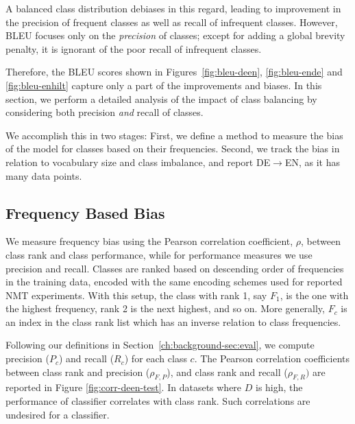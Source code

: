 A balanced class distribution debiases in this regard, leading to improvement in the precision of frequent classes as well as recall of infrequent classes.
However, BLEU focuses only on the \textit{precision} of classes; except for adding a global brevity penalty, it is ignorant of the poor recall of infrequent classes. 

Therefore, the BLEU scores shown in Figures~\ref{fig:bleu-deen}, \ref{fig:bleu-ende} and \ref{fig:bleu-enhilt} capture only a part of the improvements and biases. 
In this section, we perform a detailed analysis of the impact of class balancing by considering both precision \textit{and} recall of classes. 

We accomplish this in two stages:
First, we define a method to measure the bias of the model for classes based on their frequencies.
Second, we track the bias in relation to vocabulary size and class imbalance, and report DE$\rightarrow$EN, as it has many data points.

\subsection{Frequency Based Bias}
We measure frequency bias using the Pearson correlation coefficient, $\rho$, between class rank and class performance, while for performance measures we use precision and recall.
Classes are ranked based on descending order of frequencies in the training data, encoded with the same encoding schemes used for reported NMT experiments.
With this setup, the class with rank 1, say $F_1$, is the one with the highest frequency, rank 2 is the next highest, and so on.
More generally, $F_c$ is an index in the class rank list which has an inverse relation to class frequencies.

Following our definitions in Section~\ref{ch:background-sec:eval}, we compute precision ($P_c$) and recall ($R_c$) for each class $c$.
The Pearson correlation coefficients between class rank and precision ($\rho_{F, P}$), and class rank and recall ($\rho_{F, R})$ are reported in Figure \ref{fig:corr-deen-test}.
In datasets where $D$ is high, the performance of classifier correlates with class rank. Such correlations are undesired for a classifier.



